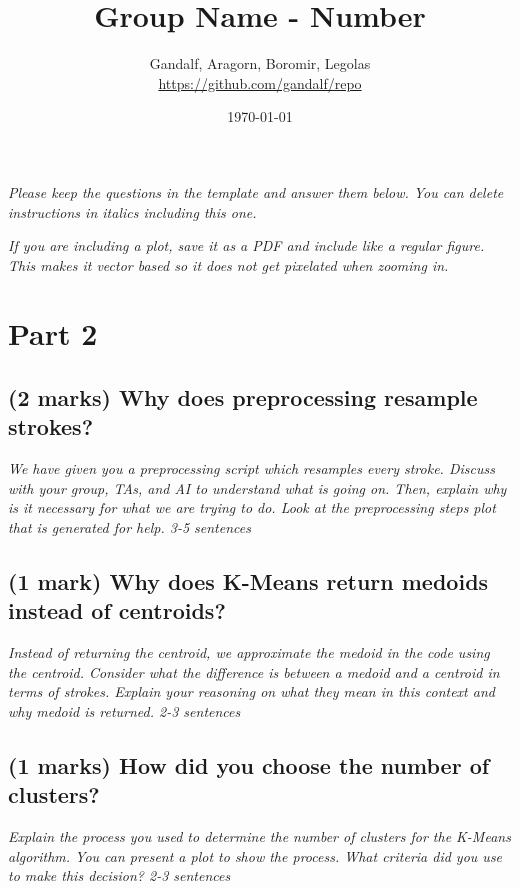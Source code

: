 \documentclass[11pt,a4paper]{article}
\title{Group Name - Number}
\author{Gandalf, Aragorn, Boromir, Legolas \\ \url{https://github.com/gandalf/repo}}
\date{\today}
\begin{document}
\maketitle

\textit{Please keep the questions in the template and answer them below. You can delete instructions in italics including this one.}

\textit{If you are including a plot, save it as a PDF and include like a regular figure. This makes it vector based so it does not get pixelated when zooming in.}

\section{Part 2}

\subsection{(2 marks) Why does preprocessing resample strokes?}\label{p2_report_resample_strokes}

\textit{We have given you a preprocessing script which resamples every stroke. Discuss with your group, TAs, and AI to understand what is going on. Then, explain why is it necessary for what we are trying to do. Look at the preprocessing steps plot that is generated for help. 3-5 sentences}

\subsection{(1 mark) Why does K-Means return medoids instead of centroids?}\label{p2_report_medoids_vs_centroids}

\textit{Instead of returning the centroid, we approximate the medoid in the code using the centroid. Consider what the difference is between a medoid and a centroid in terms of strokes. Explain your reasoning on what they mean in this context and why medoid is returned. 2-3 sentences}

\subsection{(1 marks) How did you choose the number of clusters? }\label{p2_report_kmeans_tuning}

\textit{Explain the process you used to determine the number of clusters for the K-Means algorithm. You can present a plot to show the process. What criteria did you use to make this decision? 2-3 sentences}
\end{document}
